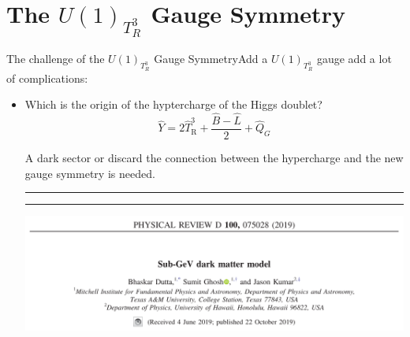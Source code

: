 \documentclass{../bredelebeamer}
\begin{document}
\section{The $U(1)_{T^3_R}$ Gauge Symmetry}

\begin{frame}{The challenge of the $U(1)_{T^3_R}$ Gauge Symmetry}{Add a $U(1)_{T^3_R}$ gauge add a lot of complications: }
	\begin{itemize}
		\item Which is the origin of the hyptercharge of the Higgs doublet? 
		\begin{equation}
			\hat Y = 2\hat T^3_{\text{R}} + \frac{\hat B - \hat L}{2} + \hat Q_G
		\end{equation}
		
		

		A dark sector or discard the connection between the hypercharge and the new gauge symmetry is needed.

		\vfill 
		\hrule\hrule
		\begin{center}
			\includegraphics[width=\textwidth]{dutta2019.png}
		\end{center}
	\end{itemize}
\end{frame}
\end{document}
